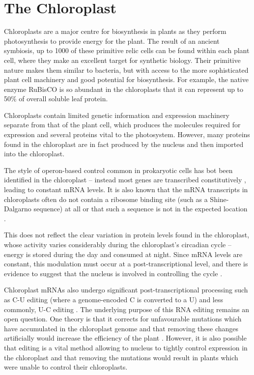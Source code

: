 \section{The Chloroplast}
\label{sec:intro_chloroplast}

Chloroplasts are a major centre for biosynthesis in plants as they perform
photosynthesis to provide energy for the plant.
The result of an ancient symbiosis, up to 1000 of these primitive relic cells 
can be found within each plant cell, where they make an excellent target for 
synthetic biology.
Their primitive nature makes them similar to bacteria, 
but with access to the more sophisticated plant cell machinery and 
good potential for biosynthesis.
For example, the native enzyme RuBisCO is so abundant in the chloroplasts that 
it can represent up to 50\% of overall soluble leaf protein.

Chloroplasts contain limited genetic information and expression machinery 
separate from that of the plant cell, which produces the molecules required 
for expression and several proteins vital to the photosystem.
However, many proteins found in the chloroplast are in fact produced by the
nucleus and then imported into the chloroplast.

The style of operon-based control common in prokaryotic cells has bot been
identified in the chloroplast -- instead most genes are 
transcribed constitutively \citep{Sugita1996}, leading to constant mRNA levels.
It is also known that the mRNA transcripts in chloroplasts often do not 
contain a ribosome binding site (such as a Shine-Dalgarno sequence) at all or 
that such a sequence is not in the expected 
location \citep{Sugiura1998,Zerges2000}.

This does not reflect the clear variation in protein levels found in the 
chloroplast, whose activity varies considerably during the chloroplast's 
circadian cycle -- energy is stored during the day and consumed at night.
Since mRNA levels are constant, this modulation must occur at a 
post-transcriptional level, and there is evidence to suggest that the nucleus
is involved in controlling the cycle \citep{Matsuo2006}.

Chloroplast mRNAs also undergo significant post-transcriptional processing such
as C-U editing (where a genome-encoded C is converted to a U) and less 
commonly, U-C editing \citep{Castandet2011}.
The underlying purpose of this RNA editing remains an open question. 
One theory is that it corrects for unfavourable mutations which have
accumulated in the chloroplast genome and that removing these changes 
artificially would increase the efficiency of the plant \citep{Fujii2011}.
However, it is also possible that editing is a vital method allowing to nucleus
to tightly control expression in the chloroplast and that removing the 
mutations would result in plants which were unable to control their 
chloroplasts.


